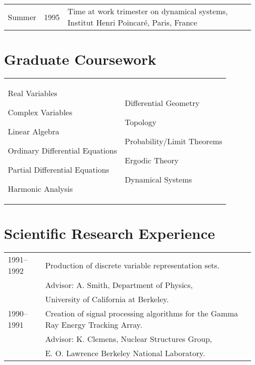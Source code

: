 \documentclass[margin,line,pifont,palatino,courier]{res}
\newenvironment{list1}{
  \begin{list}{\ding{113}}{%
      \setlength{\itemsep}{0in}
      \setlength{\parsep}{0in} \setlength{\parskip}{0in}
      \setlength{\topsep}{0in} \setlength{\partopsep}{0in}
      \setlength{\leftmargin}{0.17in}}}{\end{list}}
\begin{document}
\begin{resume}
\begin{tabular}{@{}p{0.4in}p{0.3in}p{4in}}
Summer & 1995 & Time at work trimester on
dynamical systems, Institut Henri Poincaré, Paris, France\\
\end{tabular}

\section{\sc Graduate Coursework}

\begin{tabular}{@{}p{2.3in}p{3in}}
\begin{list1}
\item Real Variables
\item Complex Variables
\item Linear Algebra
\item Ordinary Differential Equations
\item Partial Differential Equations
\item Harmonic Analysis
\end{list1}
&
\begin{list1}
\item Differential Geometry
\item Topology
\item Probability/Limit Theorems
\item Ergodic Theory
\item Dynamical Systems
\end{list1}

\end{tabular}

\section{\sc Scientific Research Experience}

\begin{tabular}{@{}p{0.8in}p{4in}}

1991--1992 & Production of discrete variable representation sets. \\
& \hspace{0.2in} Advisor: A. Smith, Department of Physics,\\
& \hspace{0.2in} University of California at Berkeley.\\

1990--1991 & Creation of signal processing algorithms for the Gamma Ray Energy Tracking Array. \\
& \hspace{0.2in} Advisor: K. Clemens, Nuclear Structures Group, \\
& \hspace{0.2in} E. O. Lawrence Berkeley National Laboratory.\\


\end{tabular}
\end{resume}
\end{document}
